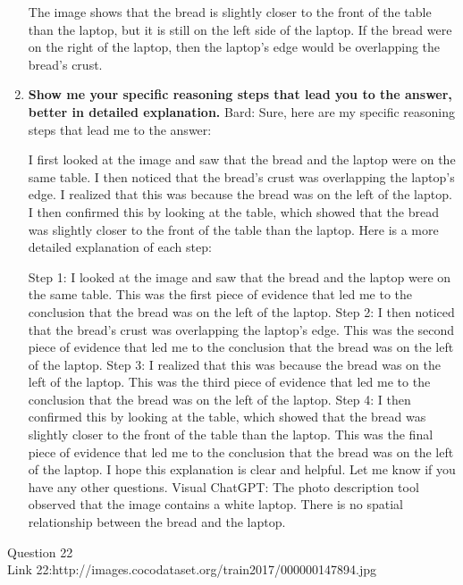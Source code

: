 \begin{enumerate}
        The image shows that the bread is slightly closer to the front of the table than the laptop, but it is still on the left side of the laptop. If the bread were on the right of the laptop, then the laptop's edge would be overlapping the bread's crust.
        \item \textbf{Show me your specific reasoning steps that lead you to the answer, better in detailed explanation.}
        \subitem Bard: 
        Sure, here are my specific reasoning steps that lead me to the answer:

        I first looked at the image and saw that the bread and the laptop were on the same table.
        I then noticed that the bread's crust was overlapping the laptop's edge.
        I realized that this was because the bread was on the left of the laptop.
        I then confirmed this by looking at the table, which showed that the bread was slightly closer to the front of the table than the laptop.
        Here is a more detailed explanation of each step:

        Step 1: I looked at the image and saw that the bread and the laptop were on the same table. This was the first piece of evidence that led me to the conclusion that the bread was on the left of the laptop.
        Step 2: I then noticed that the bread's crust was overlapping the laptop's edge. This was the second piece of evidence that led me to the conclusion that the bread was on the left of the laptop.
        Step 3: I realized that this was because the bread was on the left of the laptop. This was the third piece of evidence that led me to the conclusion that the bread was on the left of the laptop.
        Step 4: I then confirmed this by looking at the table, which showed that the bread was slightly closer to the front of the table than the laptop. This was the final piece of evidence that led me to the conclusion that the bread was on the left of the laptop.
        I hope this explanation is clear and helpful. Let me know if you have any other questions.
        \subitem Visual ChatGPT: The photo description tool observed that the image contains a white laptop. There is no spatial relationship between the bread and the laptop.
    \end{enumerate}
Question 22\\
Link 22:http://images.cocodataset.org/train2017/000000147894.jpg
